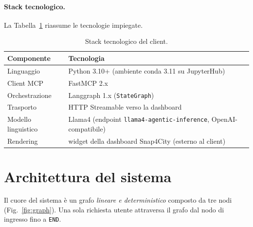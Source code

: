 \documentclass[11pt,a4paper]{article}
\begin{document}
\paragraph{Stack tecnologico.} La Tabella~\ref{tab:stack} riassume le tecnologie
impiegate.

\begin{table}[h]
\centering
\begin{tabular}{ll}
\toprule
\textbf{Componente} & \textbf{Tecnologia} \\
\midrule
Linguaggio          & Python 3.10+ (ambiente conda 3.11 su JupyterHub) \\
Client MCP          & FastMCP 2.x \\
Orchestrazione      & Langgraph 1.x (\texttt{StateGraph}) \\
Trasporto           & HTTP Streamable verso la dashboard \\
Modello linguistico & Llama4 (endpoint \texttt{llama4-agentic-inference}, OpenAI-compatibile) \\
Rendering           & widget della dashboard Snap4City (esterno al client) \\
\bottomrule
\end{tabular}
\caption{Stack tecnologico del client.}
\label{tab:stack}
\end{table}

\section{Architettura del sistema}
Il cuore del sistema è un grafo \emph{lineare e deterministico} composto da tre
nodi (Fig.~\ref{fig:graph}). Una sola richiesta utente attraversa il grafo dal
nodo di ingresso fino a \texttt{END}.
\end{document}
